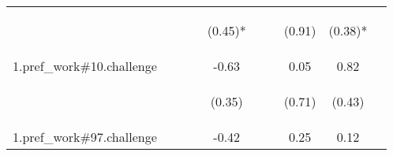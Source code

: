 \begin{center}
\begin{tabular}{lccccccccc}
 & \begin{footnotesize}\end{footnotesize} & \begin{footnotesize}\end{footnotesize} & \begin{footnotesize}\end{footnotesize} & \begin{footnotesize}(0.45)*\end{footnotesize} & \begin{footnotesize}\end{footnotesize} & \begin{footnotesize}\end{footnotesize} & \begin{footnotesize}(0.91)\end{footnotesize} & \begin{footnotesize}(0.38)*\end{footnotesize} & \begin{footnotesize}\end{footnotesize}\\
\noalign{\smallskip}1.pref_work\#10.challenge &  &  &  & -0.63 &  &  & 0.05 & 0.82 & \\
 & \begin{footnotesize}\end{footnotesize} & \begin{footnotesize}\end{footnotesize} & \begin{footnotesize}\end{footnotesize} & \begin{footnotesize}(0.35)\end{footnotesize} & \begin{footnotesize}\end{footnotesize} & \begin{footnotesize}\end{footnotesize} & \begin{footnotesize}(0.71)\end{footnotesize} & \begin{footnotesize}(0.43)\end{footnotesize} & \begin{footnotesize}\end{footnotesize}\\
\noalign{\smallskip}1.pref_work\#97.challenge &  &  &  & -0.42 &  &  & 0.25 & 0.12 & \\

\end{tabular}
\end{center}
